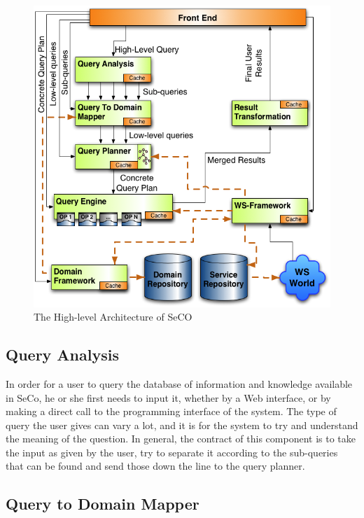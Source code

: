 \begin{figure}[ht!]
  \begin{center}
    \includegraphics[width=\linewidth]{images/secoarchitecture}
  \end{center}
  \caption{The High-level Architecture of SeCO}\label{fig:secoArchitecture}
\end{figure}

\subsection{Query Analysis} %
\label{sub:query_analysis}

In order for a user to query the database of information and knowledge available in SeCo, he or she first needs to input it, whether by a Web interface, or by making a direct call to the programming interface of the system. The type of query the user gives can vary a lot, and it is for the system to try and understand the meaning of the question. In general, the contract of this component is to take the input as given by the user, try to separate it according to the sub-queries that can be found and send those down the line to the query planner.


\subsection{Query to Domain Mapper} %
\label{sub:query_to_domain_mapper}


